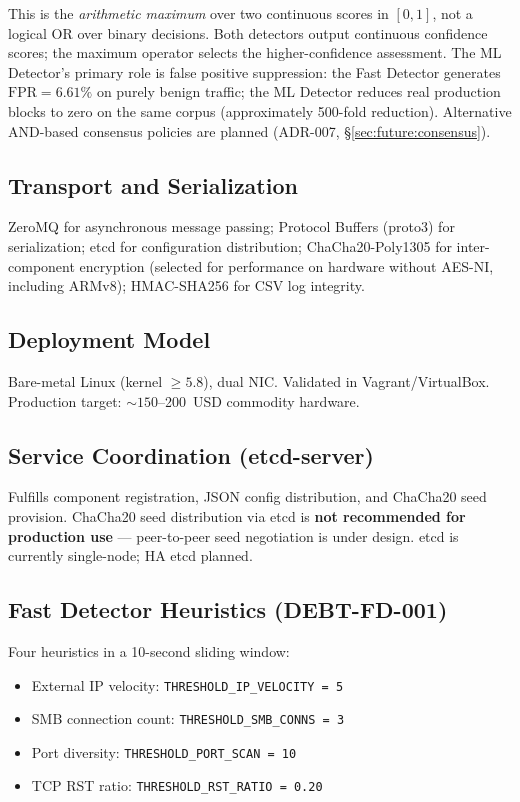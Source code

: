 \documentclass[11pt,a4paper]{article}
\begin{document}
This is the \emph{arithmetic maximum} over two continuous scores in $[0,1]$, not a logical
OR over binary decisions. Both detectors output continuous confidence scores; the maximum
operator selects the higher-confidence assessment. The ML Detector's primary role is false
positive suppression: the Fast Detector generates $\text{FPR} = 6.61\%$ on purely benign
traffic; the ML Detector reduces real production blocks to zero on the same corpus
(approximately 500-fold reduction). Alternative AND-based consensus policies are planned
(ADR-007, \S\ref{sec:future:consensus}).

\subsection{Transport and Serialization}

ZeroMQ for asynchronous message passing; Protocol Buffers (proto3) for serialization; etcd
for configuration distribution; ChaCha20-Poly1305 for inter-component encryption (selected
for performance on hardware without AES-NI, including ARMv8); HMAC-SHA256 for CSV log
integrity.

\subsection{Deployment Model}

Bare-metal Linux (kernel $\geq 5.8$), dual NIC. Validated in Vagrant/VirtualBox. Production
target: ${\sim}150$--200~USD commodity hardware.

\subsection{Service Coordination (etcd-server)}

Fulfills component registration, JSON config distribution, and ChaCha20 seed provision.
ChaCha20 seed distribution via etcd is \textbf{not recommended for production use} ---
peer-to-peer seed negotiation is under design. etcd is currently single-node; HA etcd
planned.

\subsection{Fast Detector Heuristics (DEBT-FD-001)}

Four heuristics in a 10-second sliding window:

\begin{itemize}
  \item External IP velocity: \texttt{THRESHOLD\_IP\_VELOCITY = 5}
  \item SMB connection count: \texttt{THRESHOLD\_SMB\_CONNS = 3}
  \item Port diversity: \texttt{THRESHOLD\_PORT\_SCAN = 10}
  \item TCP RST ratio: \texttt{THRESHOLD\_RST\_RATIO = 0.20}
\end{itemize}
\end{document}
